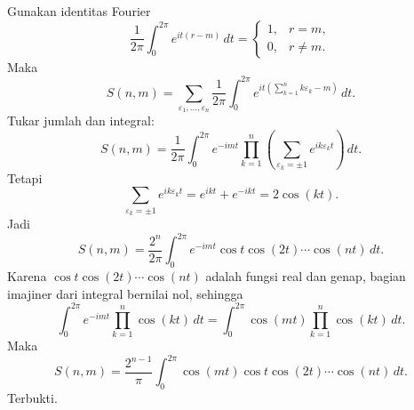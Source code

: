\documentclass[12pt]{article}
\begin{document}
\begin{enumerate}
        Gunakan identitas Fourier
        \[
          \frac{1}{2\pi}\int_0^{2\pi} e^{it(r-m)}\,dt=
          \begin{cases}
            1, & r=m,    \\
            0, & r\ne m.
          \end{cases}
        \]
        Maka
        \[
          S(n,m)
          =\sum_{\varepsilon_1,\dots,\varepsilon_n}
          \frac{1}{2\pi}\int_0^{2\pi}
          e^{it(\sum_{k=1}^n k\varepsilon_k-m)}\,dt.
        \]
        Tukar jumlah dan integral:
        \[
          S(n,m)
          =\frac{1}{2\pi}\int_0^{2\pi}
          e^{-imt}
          \prod_{k=1}^n
          \left(\sum_{\varepsilon_k=\pm 1}e^{ik\varepsilon_k t}\right)\,dt.
        \]
        Tetapi
        \[
          \sum_{\varepsilon_k=\pm 1}e^{ik\varepsilon_k t}
          =e^{ikt}+e^{-ikt}
          =2\cos(kt).
        \]
        Jadi
        \[
          S(n,m)
          =\frac{2^n}{2\pi}\int_0^{2\pi}
          e^{-imt}\cos t\cos(2t)\cdots\cos(nt)\,dt.
        \]
        Karena $\cos t\cos(2t)\cdots\cos(nt)$ adalah fungsi real dan genap, bagian imajiner dari integral bernilai nol, sehingga
        \[
          \int_0^{2\pi} e^{-imt}\prod_{k=1}^n \cos(kt)\,dt
          =
          \int_0^{2\pi} \cos(mt)\prod_{k=1}^n \cos(kt)\,dt.
        \]
        Maka
        \[
          S(n,m)
          =\frac{2^{n-1}}{\pi}\int_0^{2\pi}
          \cos(mt)\cos t\cos(2t)\cdots\cos(nt)\,dt.
        \]
        Terbukti.
\end{enumerate}
\end{document}
